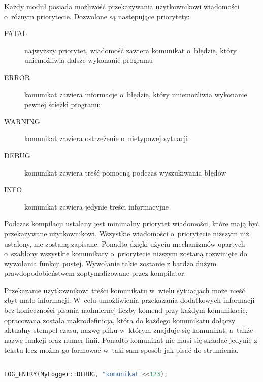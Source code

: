 Każdy moduł posiada możliwość przekazywania użytkownikowi wiadomości
o~różnym priorytecie. Dozwolone są następujące priorytety:

\begin{description}
\item[FATAL] najwyższy priorytet, wiadomość zawiera komunikat
  o~błędzie, który uniemożliwia dalsze wykonanie programu
\item[ERROR] komunikat zawiera informacje o~błędzie, który
  uniemożliwia wykonanie pewnej ścieżki programu
\item[WARNING] komunikat zawiera ostrzeżenie o~nietypowej sytuacji
\item[DEBUG] komunikat zawiera treść pomocną podczas wyszukiwania błędów
\item[INFO] komunikat zawiera jedynie treści informacyjne
\end{description}

Podczas kompilacji ustalany jest minimalny priorytet wiadomości, które
mają być przekazywane użytkownikowi. Wszystkie wiadomości
o~priorytecie niższym niż ustalony, nie zostaną zapisane. Ponadto
dzięki użyciu mechanizmów opartych o~szablony wszystkie komunikaty
o~priorytecie niższym zostaną rozwinięte do wywołania funkcji
pustej. Wywołanie takie zostanie z bardzo dużym prawdopodobieństwem
zoptymalizowane przez kompilator.

Przekazanie użytkownikowi treści komunikatu w~wielu sytuacjach może
nieść zbyt mało informacji. W~celu umożliwienia przekazania
dodatkowych informacji bez konieczności pisania nadmiernej liczby
komend przy każdym komunikacie, opracowana została makrodefinicja,
która do każdego komunikatu dołączy aktualny stempel czasu, nazwę
pliku w~którym znajduje się komunikat, a~także nazwę funkcji oraz
numer linii. Ponadto komunikat nie musi się składać jedynie z tekstu
lecz można go formować w~taki sam sposób jak pisać do strumienia.

\vspace{0.5cm}
\begin{minipage}{\textwidth}
\begin{lstlisting}[language=c++, breaklines=true, linewidth=0.99\textwidth, caption=Przykładowe wypisanie komunikatu]

LOG_ENTRY(MyLogger::DEBUG, "komunikat"<<123);

\end{lstlisting}
\end{minipage}
\vspace{0.5cm}

